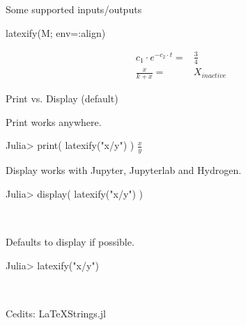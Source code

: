 \documentclass{beamer}
\begin{document}
\begin{frame}[fragile]{Some supported inputs/outputs}
\begin{onlyenv}
    \begin{juliacode}
      latexify(M; env=:align)
    \end{juliacode}
    \vspace{-8mm}
\begin{align*}
c_{1} \cdot e^{ - c_{2} \cdot t} =& \frac{3}{4} \\
\frac{x}{k + x} =& X_{inactive}
\end{align*}
  \end{onlyenv}

%
%
\end{frame}


\begin{frame}[fragile]{Print vs. Display (default)}

  \textbullet Print works anywhere.
  \begin{juliacode}
    Julia> print( latexify("x/y") )
    $\frac{x}{y}$
  \end{juliacode}

  \textbullet Display works with Jupyter, Jupyterlab and Hydrogen.
  \begin{juliacode}
    Julia> display( latexify("x/y") )

    ~\large\textcolor{white}{$\frac{x}{y}$}~
  \end{juliacode}

  \textbullet Defaults to display if possible.
  \begin{juliacode}
    Julia> latexify("x/y")

    ~\large\textcolor{white}{$\frac{x}{y}$}~
  \end{juliacode}

  Cedits: LaTeXStrings.jl


\end{frame}
\end{document}
